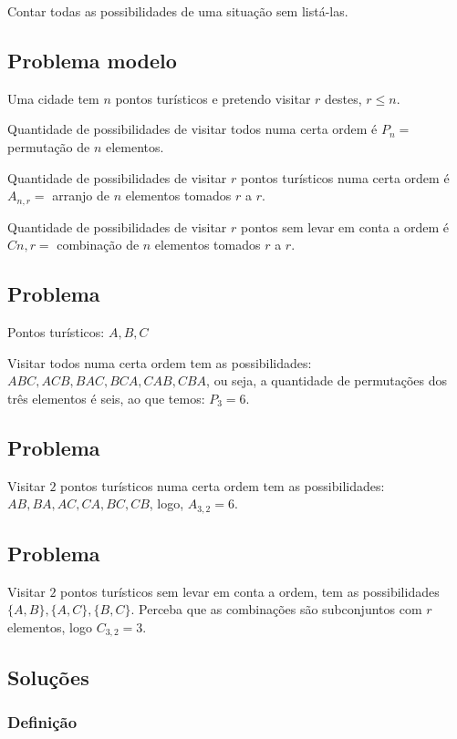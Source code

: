 \documentclass[a4paper]{article}
\begin{document}
	Contar todas as possibilidades de uma situação sem listá-las.
	
	\subsection{Problema modelo}
	
	\noindent Uma cidade tem $n$ pontos turísticos e pretendo visitar $r$ destes, $r \leq n$.
	
	Quantidade de possibilidades de visitar todos numa certa ordem é $P_n =$ permutação de $n$ elementos.
	
	Quantidade de possibilidades de visitar $r$ pontos turísticos numa certa ordem é $A_{n,r} =$ arranjo de $n$ elementos tomados $r$ a $r$.
	
	Quantidade de possibilidades de visitar $r$ pontos sem levar em conta a ordem é $Cn,r =$ combinação de $n$ elementos tomados $r$ a $r$.
	
	\subsection{Problema}
	
	Pontos turísticos: $A, B, C$
	
	Visitar todos numa certa ordem tem as possibilidades: $ABC, ACB, BAC, BCA, CAB, CBA$, ou seja, a quantidade de permutações dos três elementos é seis, ao que temos: $P_3 = 6$.
	
	\subsection{Problema}
	
	Visitar $2$ pontos turísticos numa certa ordem tem as possibilidades: $AB, BA, AC, CA, BC, CB$, logo, $A_{3,2} = 6$.
	
	\subsection{Problema}
	
	Visitar $2$ pontos turísticos sem levar em conta a ordem, tem as possibilidades $\{A,B\}, \{A,C\}, \{B,C\}$. Perceba que as combinações são subconjuntos com $r$ elementos, logo $C_{3,2} = 3$.
	
	\subsection{Soluções}
	
	\subsubsection{Definição}
	
\end{document}
